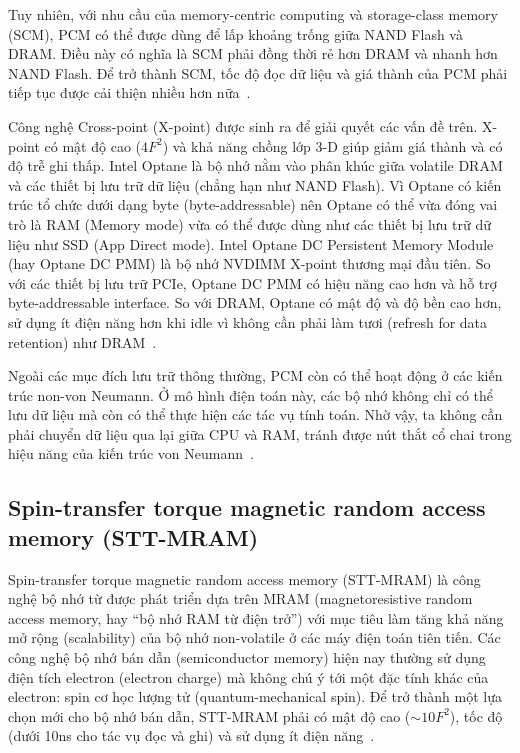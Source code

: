 Tuy nhiên, với nhu cầu của memory-centric computing và storage-class memory
(SCM), PCM có thể được dùng để lấp khoảng trống giữa NAND Flash và DRAM. Điều
này có nghĩa là SCM phải đồng thời rẻ hơn DRAM và nhanh hơn NAND Flash. Để trở
thành SCM, tốc độ đọc dữ liệu và giá thành của PCM phải tiếp tục được cải thiện
nhiều hơn nữa~\cite{kimEvolutionPhaseChangeMemory2020}.

Công nghệ Cross-point (X-point) được sinh ra để giải quyết các vấn đề trên.
X-point có mật độ cao ($4F^2$) và khả năng chồng lớp 3-D giúp giảm giá thành và
có độ trễ ghi thấp. Intel Optane là bộ nhớ nằm vào phân khúc giữa volatile DRAM
và các thiết bị lưu trữ dữ liệu (chẳng hạn như NAND Flash). Vì Optane có kiến
trúc tổ chức dưới dạng byte (byte-addressable) nên Optane có thể vừa đóng vai
trò là RAM (Memory mode) vừa có thể được dùng như các thiết bị lưu trữ dữ liệu
như SSD (App Direct mode). Intel Optane DC Persistent Memory Module (hay Optane
DC PMM) là bộ nhớ NVDIMM X-point thương mại đầu tiên. So với các thiết bị lưu
trữ PCIe, Optane DC PMM có hiệu năng cao hơn và hỗ trợ byte-addressable
interface. So với DRAM, Optane có mật độ và độ bền cao hơn, sử dụng ít điện năng
hơn khi idle vì không cần phải làm tươi (refresh for data retention) như
DRAM~\cite{izraelevitzBasicPerformanceMeasurements2019}.

Ngoài các mục đích lưu trữ thông thường, PCM còn có thể hoạt động ở các kiến
trúc non-von Neumann. Ở mô hình điện toán này, các bộ nhớ không chỉ có thể lưu
dữ liệu mà còn có thể thực hiện các tác vụ tính toán. Nhờ vậy, ta không cần
phải chuyển dữ liệu qua lại giữa CPU và RAM, tránh được nút thắt cổ chai trong
hiệu năng của kiến trúc von Neumann~\cite{galloOverviewPhasechangeMemory2020}.

\subsection{Spin-transfer torque magnetic random access memory (STT-MRAM)}
Spin-transfer torque magnetic random access memory (STT-MRAM) là công nghệ bộ
nhớ từ được phát triển dựa trên MRAM (magnetoresistive random access memory,
hay ``bộ nhớ RAM từ điện trở'') với mục tiêu làm tăng khả năng mở rộng
(scalability) của bộ nhớ non-volatile ở các máy điện toán tiên tiến. Các công
nghệ bộ nhớ bán dẫn (semiconductor memory) hiện nay thường sử dụng điện tích
electron (electron charge) mà không chú ý tới một đặc tính khác của electron:
spin cơ học lượng tử (quantum-mechanical spin). Để trở thành một lựa chọn mới
cho bộ nhớ bán dẫn, STT-MRAM phải có mật độ cao ($\sim10F^2$), tốc độ (dưới
10ns cho tác vụ đọc và ghi) và sử dụng ít điện
năng~\cite{apalkovSpintransferTorqueMagnetic2013}.

